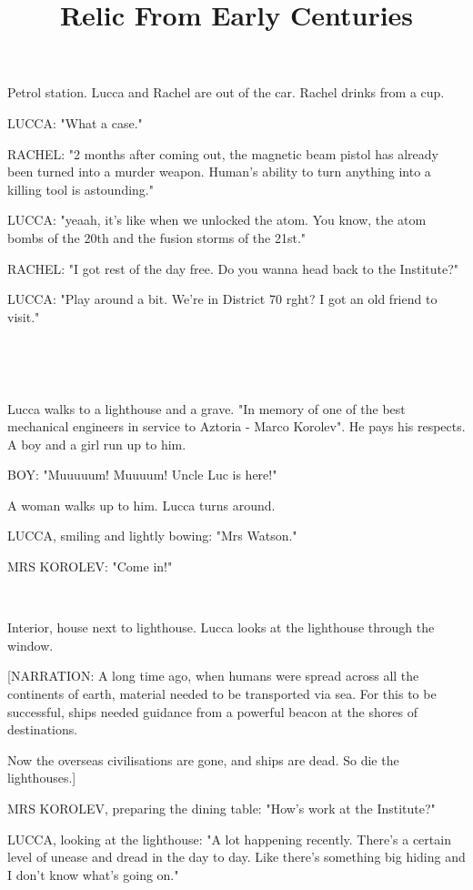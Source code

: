 \documentclass[11pt]{article}
\begin{document}
\ttfamily
\title{Relic From Early Centuries}
\maketitle


Petrol station. 
Lucca and Rachel are out of the car.
Rachel drinks from a cup.

LUCCA: "What a case."

RACHEL: "2 months after coming out, the magnetic beam pistol has already been turned into a murder weapon. 
Human's ability to turn anything into a killing tool is astounding."

LUCCA: "yeaah, it's like when we unlocked the atom.
You know, the atom bombs of the 20th and the fusion storms of the 21st."

RACHEL: "I got rest of the day free. 
Do you wanna head back to the Institute?"

LUCCA: "Play around a bit.
We're in District 70 rght? 
I got an old friend to visit."

\ 

\ 

Lucca walks to a lighthouse and a grave.
"In memory of one of the best mechanical engineers in service to Aztoria - Marco Korolev".
He pays his respects. 
A boy and a girl run up to him.

BOY: "Muuuuum! Muuuum! Uncle Luc is here!"

A woman walks up to him.
Lucca turns around.

LUCCA, smiling and lightly bowing: "Mrs Watson."

MRS KOROLEV: "Come in!"

\ 

Interior, house next to lighthouse.
Lucca looks at the lighthouse through the window.

[NARRATION: A long time ago, when humans were spread across all the continents of earth, material needed to be transported via sea. 
For this to be successful, ships needed guidance from a powerful beacon at the shores of destinations.

Now the overseas civilisations are gone, and ships are dead. So die the lighthouses.]

MRS KOROLEV, preparing the dining table: "How's work at the Institute?"

LUCCA, looking at the lighthouse: "A lot happening recently. 
There's a certain level of unease and dread in the day to day.
Like there's something big hiding and I don't know what's going on."
\end{document}
